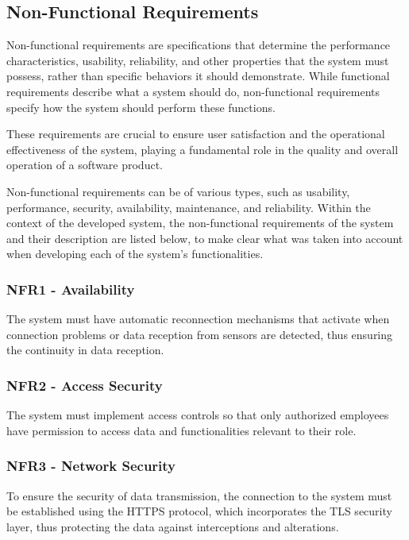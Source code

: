 \subsection[Non-Functional Requirements]{Non-Functional Requirements}\label{ssubec:reqNfuctional}
Non-functional requirements are specifications that determine the performance characteristics, usability, reliability, and other properties that the system must possess, rather than specific behaviors it should demonstrate. While functional requirements describe what a system should do, non-functional requirements specify how the system should perform these functions.

These requirements are crucial to ensure user satisfaction and the operational effectiveness of the system, playing a fundamental role in the quality and overall operation of a software product.

Non-functional requirements can be of various types, such as usability, performance, security, availability, maintenance, and reliability. Within the context of the developed system, the non-functional requirements of the system and their description are listed below, to make clear what was taken into account when developing each of the system's functionalities.

\subsubsection{NFR1 - Availability}The system must have automatic reconnection mechanisms that activate when connection problems or data reception from sensors are detected, thus ensuring the continuity in data reception.

\subsubsection{NFR2 - Access Security}
The system must implement access controls so that only authorized employees have permission to access data and functionalities relevant to their role.

\subsubsection{NFR3 - Network Security}
To ensure the security of data transmission, the connection to the system must be established using the \gls{HTTPS} protocol, which incorporates the \gls{TLS} security layer, thus protecting the data against interceptions and alterations.

